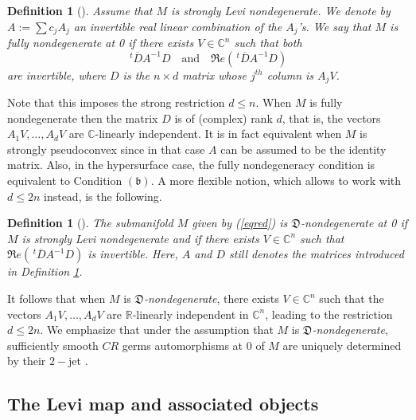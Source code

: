 \documentclass[10pt,a4paper]{amsart}
\newcommand{\C}{\mathbb C}
\newcommand{\R}{\mathbb R}
\newcommand{\transp}{\,^t}
\newcommand{\bbb}{\mathfrak{(b)}}
\newtheorem{defi}[theo]{Definition}
\numberwithin{equation}{section}
\begin{document}
\begin{defi} [\cite{be-bl-me}]\label{deffully} 
Assume that $M$ is  strongly Levi 
nondegenerate. We denote by $A:=\sum c_jA_j$ an invertible real linear combination of the $A_j$'s. 
We say that  $M$ is {\it fully nondegenerate} at 0 if  there exists $V \in \C^{n}$ 
such that both $$\transp \overline D A^{-1}D \ \ \ \mbox{ and } \ \ \ \Re e \left(\transp \overline D A^{-1}D\right)$$ are invertible, where $D$ is the $n \times d$ matrix whose $j^{th}$ column is $A_jV$.  
\end{defi}
Note that this imposes the strong restriction $d\leq n$. When $M$ is fully nondegenerate then the matrix $D$ is of (complex) rank $d$, that is, the vectors $A_1V,\ldots,A_dV$ are $\C$-linearly independent. It is in fact equivalent when $M$ is strongly pseudoconvex since in that case $A$ can be assumed to be the identity matrix. 
Also, in the hypersurface case, the fully nondegeneracy condition is  equivalent to Condition $\bbb.$ A more flexible notion, which  allows to work with $d \le 2n$  instead, is the following.     
\begin{defi} [\cite{be-me}]\label{defect} 
The submanifold $M$ given by  (\ref{eqred}) is {\it$\mathfrak{D}$-nondegenerate} at 0 if $M$ is strongly Levi 
nondegenerate and  if there exists $V \in \C^n$  such that  $\Re e (\transp \overline D A^{-1}D)$ is invertible. Here, $A$ and $D$ still denotes the matrices introduced in Definition \ref{deffully}. 
\end{defi}

It  follows that when $M$ is {\it$\mathfrak{D}$-nondegenerate},   there exists $V \in \C^n$  such that the vectors $A_1V,\ldots,A_dV$ are $\R$-linearly independent in $\C^n$, leading to the restriction $d\leq 2n$. We emphasize that under the assumption that $M$ is {\it$\mathfrak{D}$-nondegenerate}, sufficiently smooth $CR$ germs automorphisms at $0$ of $M$ are uniquely determined by their $2-$jet \cite{be-me}.  

 

\subsection{The Levi map and associated objects}
\end{document}
